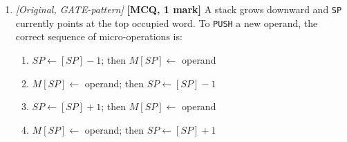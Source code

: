 \documentclass[11pt]{article}
\begin{document}
\begin{enumerate}
\item[\textbf{Q8}] \textit{[Original, GATE-pattern]} \textbf{[MCQ, 1 mark]} A stack grows downward and \texttt{SP} currently points at the top occupied word. To \texttt{PUSH} a new operand, the correct sequence of micro-operations is:
\begin{enumerate}
  \item[(A)] $SP \gets [SP] - 1$; then $M[SP] \gets$ operand
  \item[(B)] $M[SP] \gets$ operand; then $SP \gets [SP] - 1$
  \item[(C)] $SP \gets [SP] + 1$; then $M[SP] \gets$ operand
  \item[(D)] $M[SP] \gets$ operand; then $SP \gets [SP] + 1$
\end{enumerate}

\end{enumerate}
\end{document}
